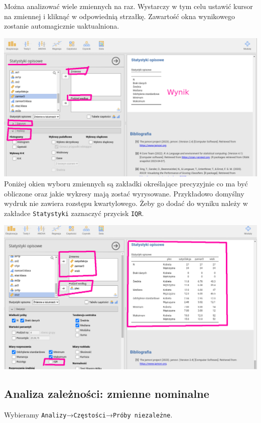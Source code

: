 \documentclass[
  openany]{book}
\begin{document}
Można analizować wiele zmiennych na raz. Wystarczy w tym celu ustawić
kursor na zmiennej i kliknąć w odpowiednią strzałkę. Zawartość okna
wynikowego zostanie automagicznie uaktualniona.

\includegraphics{./statystyki_opisowe_okno.png}
Poniżej okien wyboru zmiennych są zakładki określające
precyzyjnie co ma być obliczone oraz jakie wykresy mają
zostać wyrysowane. Przykładowo domyślny wydruk nie zawiera
rozstępu kwartylowego. Żeby go dodać do wyniku należy
w zakładce \texttt{Statystyki} zaznaczyć przycisk \texttt{IQR}.

\includegraphics{./statystyki_opisowe_wynik.png}

\hypertarget{analiza-zaleux17cnoux15bci-zmienne-nominalne}{%
\subsection{Analiza zależności: zmienne nominalne}\label{analiza-zaleux17cnoux15bci-zmienne-nominalne}}

Wybieramy \texttt{Analizy}→\texttt{Częstości}→\texttt{Próby\ niezależne}.
\end{document}
